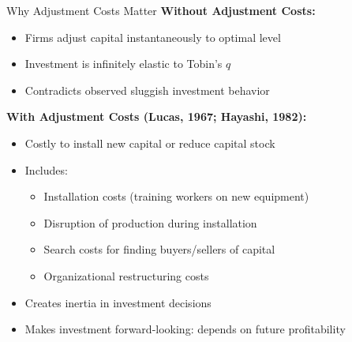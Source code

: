 \documentclass{beamer}
\begin{document}
\begin{frame}{Why Adjustment Costs Matter}
    \textbf{Without Adjustment Costs:}
    \begin{itemize}
        \item Firms adjust capital instantaneously to optimal level
        \item Investment is infinitely elastic to Tobin's $q$
        \item Contradicts observed sluggish investment behavior
    \end{itemize}
    
    
    \textbf{With Adjustment Costs (Lucas, 1967; Hayashi, 1982):}
    \begin{itemize}
        \item Costly to install new capital or reduce capital stock
        \item Includes:
        \begin{itemize}
            \item Installation costs (training workers on new equipment)
            \item Disruption of production during installation
            \item Search costs for finding buyers/sellers of capital
            \item Organizational restructuring costs
        \end{itemize}
        \item Creates inertia in investment decisions
        \item Makes investment forward-looking: depends on future profitability
    \end{itemize}
\end{frame}
\end{document}
